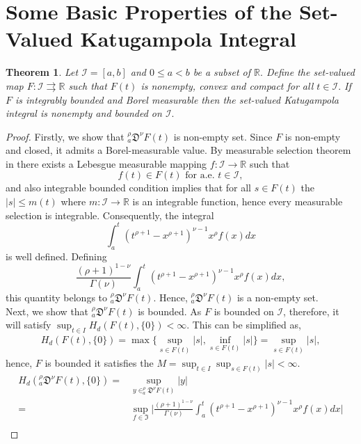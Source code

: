 \documentclass{amsproc}
\newtheorem{theorem}{Theorem}[section]
\theoremstyle{definition}
\theoremstyle{remark}
\numberwithin{equation}{section}
\begin{document}
\section{Some Basic Properties of the Set-Valued Katugampola Integral} \label{sec3}
\begin{theorem} \label{bounded}
Let $\mathcal{I}=[a,b]$ and $0 \leq a<b$ be a subset of $\mathbb{R}.$ Define the set-valued map $F:\mathcal{I}\rightrightarrows\mathbb{R}$ such that $F(t)$ is nonempty, convex and compact for all $t\in \mathcal{I}.$
If $F$ is integrably bounded and Borel measurable then the set-valued Katugampola integral is nonempty and bounded on $\mathcal{I}.$
\end{theorem}
 \begin{proof}
    Firstly, we show that $_a^\rho\mathfrak{D}^\nu F(t)$ is non-empty set. Since $F$ is non-empty and closed, it admits a Borel-measurable value. By measurable selection theorem in \cite{Aumann} there exists a Lebesgue measurable mapping $f:\mathcal{I}\to \mathbb{R}$ such that \[ f(t)\in F(t) \text{ for a.e. } t\in \mathcal{I},\] 
    and also integrable bounded condition implies that for all $s\in F(t)$ the $|s|\le m(t)$ where $m:\mathcal{I} \to \mathbb{R}$ is an integrable function, hence every measurable selection is integrable. Consequently, the integral \[ \int_a^t(t^{\rho+1}-x^{\rho+1})^{\nu-1}x^{\rho}f(x)dx\] is well defined. Defining \[ \frac{(\rho+1)^{1-\nu}}{\Gamma(\nu)}\int_a^t(t^{\rho+1}-x^{\rho+1})^{\nu-1}x^{\rho}f(x)dx,\] this quantity belongs to $_a^\rho\mathfrak{D}^\nu F(t).$ Hence, $_a^\rho\mathfrak{D}^\nu F(t)$ is a non-empty set. \\ Next, we show that $_a^\rho\mathfrak{D}^\nu F(t)$ is bounded. As $F$ is bounded on $\mathcal{I}$, therefore, it will satisfy    $\sup_{t\in I}H_d(F(t),\{0\})<\infty.$ This can be simplified as,  
    \begin{equation*}
        \begin{aligned}
     H_d(F(t),\{0\})=\max\bigg\{ \sup_{s\in F(t)}|s|,\inf_{s \in F(t) }|s|\bigg\}=\sup_{s \in F(t)}|s|,
        \end{aligned}
    \end{equation*}
    hence, $F$ is bounded it satisfies the $ M= \sup_{t\in I}\sup_{s \in F(t) }|s| < \infty.$
    \begin{equation*}
        \begin{aligned}
            H_d(_a^\rho\mathfrak{D}^\nu F(t),\{0\})=&\sup_{ y \in _a^\rho\mathfrak{D}^\nu F(t)} |y|\\
            =& \sup_{f \in \mathfrak{I}}\Bigg|\frac{(\rho+1)^{1-\nu}}{\Gamma(\nu)}\int_a^t(t^{\rho+1}-x^{\rho+1})^{\nu-1}x^{\rho}f(x)dx\Bigg|\\ 

\end{aligned}
\end{equation*}
\end{proof}
\end{document}
